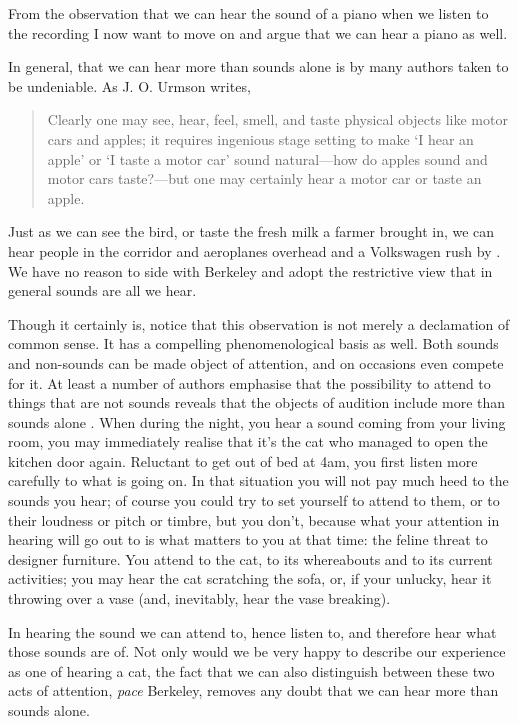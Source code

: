 \documentclass[sloppy, journal, git, bytitle, dodraft]{humapap}
\begin{document}

\sect From the observation that we can hear the sound of a piano when we listen to the recording I now want to move on and argue that we can hear a piano as well. 

In general, that we can hear more than sounds alone is by many authors taken to be undeniable. As J. O. Urmson writes, 
\begin{quote}
Clearly one may see, hear, feel, smell, and taste physical objects like motor cars and apples; it requires ingenious stage setting to make `I hear an apple' or `I taste a motor car' sound natural---how do apples sound and motor cars taste?---but one may certainly hear a motor car or taste an apple.\autocite[p. 117]{urmson1968aa}
\end{quote} Just as we can see the bird, or taste the fresh milk a farmer brought in, we can hear people in the corridor and aeroplanes overhead and a Volkswagen rush by \autocite{heidegger}. We have no reason to side with Berkeley and adopt the restrictive view that in general sounds are all we hear. 

Though it certainly is, notice that this observation is not merely a declamation of common sense. It has a compelling phenomenological basis as well. Both sounds and non-sounds can be made object of attention, and on occasions even compete for it. At least a number of authors emphasise that the possibility to attend to things that are not sounds reveals that the objects of audition include more than sounds alone \autocite[See][]{nudds2010aa}.  
When during the night, you hear a sound coming from your living room, you may immediately realise that it's the cat who managed to open the kitchen door again. Reluctant to get out of bed at 4am, you first listen more carefully to what is going on. In that situation you will not pay much heed to the sounds you hear; of course you could try to set yourself to attend to them, or to their loudness or pitch or timbre, but you don't, because what your attention in hearing will go out to is what matters to you at that time: the feline threat to designer furniture. You attend to the cat, to its whereabouts and to its current activities; you may hear the cat scratching the sofa, or, if your unlucky, hear it throwing over a vase (and, inevitably, hear the vase breaking).

In hearing the sound we can attend to, hence listen to, and therefore hear what those sounds are of. Not only would we be very happy to describe our experience as one of hearing a cat, the fact that we can also distinguish between these two acts of attention, \emph{pace} Berkeley, removes any doubt that we can hear more than sounds alone.
\end{document}
